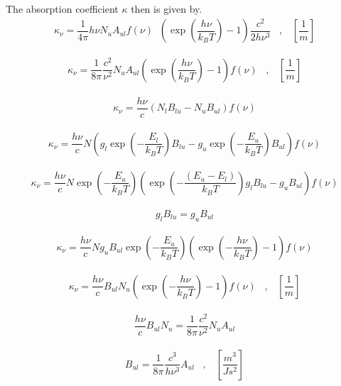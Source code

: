 The absorption coefficient $\kappa$ then is given by. 
\begin{align}
	\kappa_{\nu} = \dfrac{1}{4 \pi} h \nu N_u A_{ul} f(\nu) \;\; \left(\exp\left(\dfrac{h \nu}{k_B T}\right) - 1\right) \dfrac{c^2}{2 h \nu^3}   \;\;\; , \;\;\; \left[\dfrac{1}{m}\right]
\end{align}

\begin{align}
	\kappa_{\nu} = \dfrac{1}{8 \pi} \dfrac{c^2}{\nu^2} N_u A_{ul} \left(\exp\left(\dfrac{h \nu}{k_B T}\right) - 1\right) f(\nu)  \;\;\; , \;\;\; \left[\dfrac{1}{m}\right]
\end{align}


\begin{align}
\kappa_\nu = \dfrac{h \nu}{c} \left(N_l B_{lu} - N_u B_{ul}\right) f(\nu)
\end{align}

\begin{align} 
\kappa_\nu = \dfrac{h \nu}{c} N \left(g_l \exp\left(-\dfrac{E_l}{k_B T}\right) B_{lu} - g_u\exp\left(-\dfrac{E_u}{k_B T}\right) B_{ul}\right) f(\nu)
\end{align}

\begin{align}
\kappa_\nu = \dfrac{h \nu}{c} N \exp\left(-\dfrac{E_u}{k_B T}\right) \left(\exp\left(-\dfrac{(E_u-E_l)}{k_B T}\right) 
g_l B_{lu} - g_u B_{ul}\right) f(\nu)
\end{align}

\begin{align}
g_l B_{lu} = g_u B_{ul}
\end{align}

\begin{align}
\kappa_\nu = \dfrac{h \nu}{c} N g_u B_{ul} \exp\left(-\dfrac{E_u}{k_B T}\right) 
\left(\exp\left(-\dfrac{h \nu}{k_B T}\right) - 1\right) f(\nu)
\end{align}

\begin{align}
\kappa_\nu = \dfrac{h \nu}{c} B_{ul} N_u \left(\exp\left(-\dfrac{h \nu}{k_B T}\right) - 1\right) f(\nu) \;\;\; , \;\;\; \left[\dfrac{1}{m}\right]
\end{align}

\begin{align}
\dfrac{h \nu}{c} B_{ul} N_u = \dfrac{1}{8 \pi} \dfrac{c^2}{\nu^2} N_u A_{ul}
\end{align}

\begin{align}
B_{ul} = \dfrac{1}{8 \pi} \dfrac{c^3}{h \nu^3} A_{ul} \;\;\; , \;\;\; \left[\dfrac{m^3}{J s^2}\right]
\end{align}


